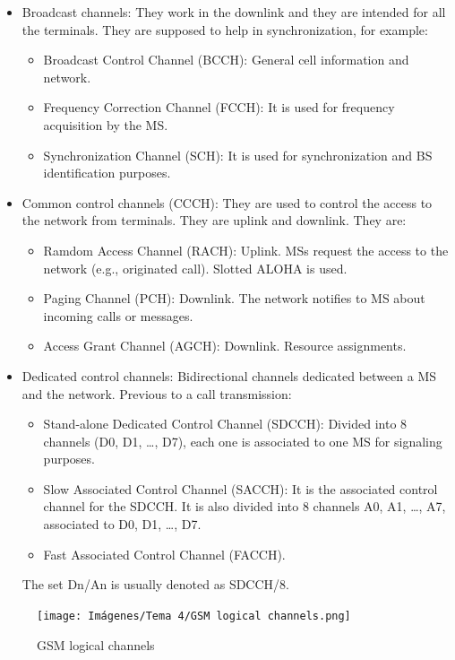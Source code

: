 \documentclass[
	12pt,
	twoside
]{book}
\begin{document}
\begin{itemize}
	\item {
		Broadcast channels: They work in the downlink and they are intended for all the terminals. They are supposed to help in synchronization, for example:
		\begin{itemize}
			\item Broadcast Control Channel (BCCH): General cell information and network.
			\item Frequency Correction Channel (FCCH): It is used for frequency acquisition by the MS.
			\item Synchronization Channel (SCH): It is used for synchronization and BS identification purposes.
		\end{itemize}
	}
	\item {
		Common control channels (CCCH): They are used to control the access to the network from terminals. They are uplink and downlink. They are:
		\begin{itemize}
			\item Ramdom Access Channel (RACH): Uplink. MSs request the access to the network (e.g., originated call). Slotted ALOHA is used.
			\item Paging Channel (PCH): Downlink. The network notifies to MS about incoming calls or messages.
			\item Access Grant Channel (AGCH): Downlink. Resource assignments.
		\end{itemize}
	}
	\item {
		Dedicated control channels: Bidirectional channels dedicated between a MS and the network. Previous to a call transmission:
		\begin{itemize}
			\item Stand-alone Dedicated Control Channel (SDCCH): Divided into 8 channels (D0, D1, \ldots, D7), each one is associated to one MS for signaling purposes.
			\item Slow Associated Control Channel (SACCH): It is the associated control channel for the SDCCH. It is also divided into 8 channels A0, A1, \ldots, A7, associated to D0, D1, \ldots, D7.
			\item Fast Associated Control Channel (FACCH).
		\end{itemize}
		The set Dn/An is usually denoted as SDCCH/8.
	}
\end{itemize}

\begin{figure}[H]
	\centering
	\texttt{[image: Imágenes/Tema 4/GSM logical channels.png]}
	\caption{
		\label{fig:unit4_GSM_log_channels}
		GSM logical channels
	}
\end{figure}
\end{document}
